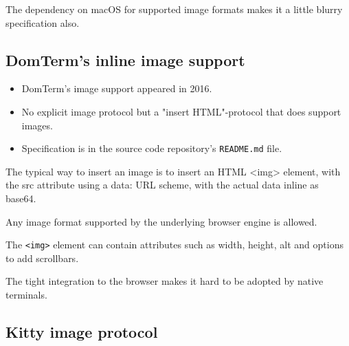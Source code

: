 \documentclass[a4paper]{article}
\begin{document}
The dependency on macOS for supported image formats makes it a little blurry
specification also.

\subsection{DomTerm's inline image support}

\begin{itemize}
    \item DomTerm's image support appeared in 2016.
    \item No explicit image protocol but a "insert HTML"-protocol that does support images.
    \item Specification is in the source code repository's \texttt{README.md} file.
\end{itemize}

The typical way to insert an image is to insert an HTML <img> element,
with the src attribute using a data: URL scheme,
with the actual data inline as base64.

Any image format supported by the underlying browser engine is allowed.

The \texttt{<img>} element can contain attributes such as width, height, alt
and options to add scrollbars.

The tight integration to the browser makes it hard to be adopted by native
terminals.
\subsection{Kitty image protocol}
\end{document}
